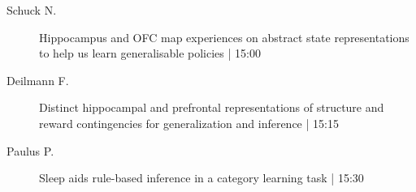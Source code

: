 \begin{symposium}
\begin{description}
                \item [ Schuck N.] Hippocampus and OFC map experiences on abstract state representations to help us learn generalisable policies \textcolor{mygray}{ | 15:00}    
                
                \item [ Deilmann F.] Distinct hippocampal and prefrontal representations of structure and reward contingencies for generalization and inference \textcolor{mygray}{ | 15:15}    
                
                \item [ Paulus P.] Sleep aids rule-based inference in a category learning task \textcolor{mygray}{ | 15:30}    
                
            \end{description} 
            \end{symposium}
            